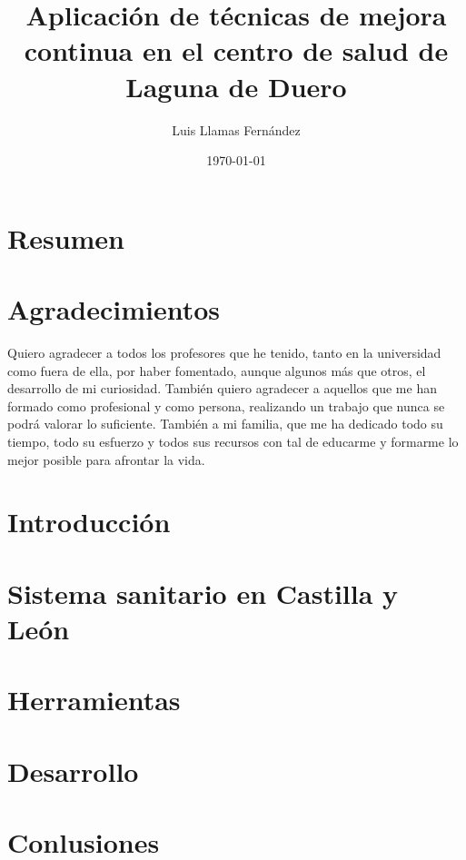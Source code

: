 \documentclass[12pt, a4paper]{report}
\begin{document}
\title{Aplicación de técnicas de mejora continua en el centro de salud de Laguna de Duero}
\author{Luis Llamas Fernández}
\date{\today}
\maketitle

\chapter*{Resumen}
\chapter*{Agradecimientos}

Quiero agradecer a todos los profesores que he tenido, tanto en la universidad como fuera de ella, por haber fomentado, aunque algunos más que otros, el desarrollo de mi curiosidad. También quiero agradecer a aquellos que me han formado como profesional y como persona, realizando un trabajo que nunca se podrá valorar lo suficiente. También a mi familia, que me ha dedicado todo su tiempo, todo su esfuerzo y todos sus recursos con tal de educarme y formarme lo mejor posible para afrontar la vida.

\tableofcontents

\chapter{Introducción}


\chapter{Sistema sanitario en Castilla y León}


\chapter{Herramientas}
\chapter{Desarrollo}
\chapter{Conlusiones}


\end{document}
